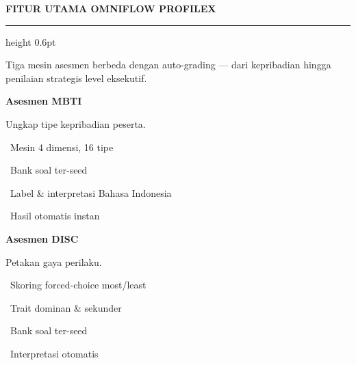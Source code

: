 \documentclass[a4paper]{article}
\newcommand{\sectiontitle}[1]{%
    \vspace{10pt}%
    {\fontsize{13}{16}\selectfont\bfseries\color{BlueDark} #1}\par\vspace{3pt}%
    {\color{BluePrimary}\hrule height 0.6pt}\par\vspace{8pt}%
}
\begin{document}
\sectiontitle{FITUR UTAMA OMNIFLOW PROFILEX}

{\fontsize{9.5}{13}\selectfont\color{TextLight} Tiga mesin asesmen berbeda dengan auto-grading --- dari kepribadian hingga penilaian strategis level eksekutif.}

\vspace{6pt}

\noindent
\begin{minipage}[t]{0.485\textwidth}
    \colorbox{BluePrimary}{%
        \begin{minipage}{\dimexpr\textwidth-2\fboxsep\relax}
            {\fontsize{10}{13}\selectfont\bfseries\color{White} Asesmen MBTI}
        \end{minipage}}\par
    \vspace{4pt}
    {\fontsize{9}{12}\selectfont\color{TextDark}%
    Ungkap tipe kepribadian peserta.\par\vspace{3pt}
    \textbullet\ Mesin 4 dimensi, 16 tipe\par\vspace{2pt}%
    \textbullet\ Bank soal ter-seed\par\vspace{2pt}%
    \textbullet\ Label \& interpretasi Bahasa Indonesia\par\vspace{2pt}%
    \textbullet\ Hasil otomatis instan}%

\end{minipage}%
\hfill
\begin{minipage}[t]{0.485\textwidth}
    \colorbox{EmeraldPrimary}{%
        \begin{minipage}{\dimexpr\textwidth-2\fboxsep\relax}
            {\fontsize{10}{13}\selectfont\bfseries\color{White} Asesmen DISC}
        \end{minipage}}\par
    \vspace{4pt}
    {\fontsize{9}{12}\selectfont\color{TextDark}%
    Petakan gaya perilaku.\par\vspace{3pt}
    \textbullet\ Skoring forced-choice most/least\par\vspace{2pt}%
    \textbullet\ Trait dominan \& sekunder\par\vspace{2pt}%
    \textbullet\ Bank soal ter-seed\par\vspace{2pt}%
    \textbullet\ Interpretasi otomatis}%

\end{minipage}
\end{document}

